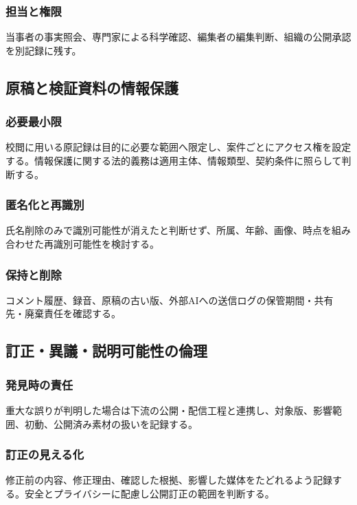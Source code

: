 \documentclass[a4paper,11pt]{article}
\begin{document}
\subsubsection{担当と権限}
\par 当事者の事実照会、専門家による科学確認、編集者の編集判断、組織の公開承認を別記録に残す。\par\medskip
\subsection{原稿と検証資料の情報保護}
\subsubsection{必要最小限}
\par 校閲に用いる原記録は目的に必要な範囲へ限定し、案件ごとにアクセス権を設定する。情報保護に関する法的義務は適用主体、情報類型、契約条件に照らして判断する。\par\medskip
\subsubsection{匿名化と再識別}
\par 氏名削除のみで識別可能性が消えたと判断せず、所属、年齢、画像、時点を組み合わせた再識別可能性を検討する。\par\medskip
\subsubsection{保持と削除}
\par コメント履歴、録音、原稿の古い版、外部AIへの送信ログの保管期間・共有先・廃棄責任を確認する。\par\medskip
\subsection{訂正・異議・説明可能性の倫理}
\subsubsection{発見時の責任}
\par 重大な誤りが判明した場合は下流の公開・配信工程と連携し、対象版、影響範囲、初動、公開済み素材の扱いを記録する。\par\medskip
\subsubsection{訂正の見える化}
\par 修正前の内容、修正理由、確認した根拠、影響した媒体をたどれるよう記録する。安全とプライバシーに配慮し公開訂正の範囲を判断する。\par\medskip
\end{document}
